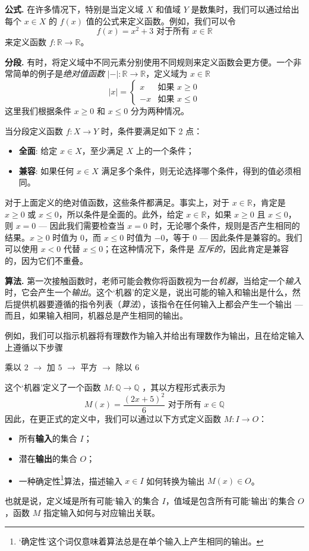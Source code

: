 \textbf{公式. } 在许多情况下，特别是当定义域 $X$ 和值域 $Y$ 是数集时，我们可以通过给出每个 $x \in X$ 的 $f(x)$ 值的公式来定义函数。例如，我们可以令 
\[ f(x) = x^2 + 3 \text{ 对于所有 } x \in \mathbb{R} \] 
来定义函数 $f : \mathbb{R} \to \mathbb{R}$。

\textbf{分段. } 有时，将定义域中不同元素分别使用不同规则来定义函数会更方便。一个非常简单的例子是\textit{绝对值函数} $|{-}| : \mathbb{R} \to \mathbb{R}$，定义域为 $x \in \mathbb{R}$
\[ |x| = \begin{cases} x & \text{如果 } x \ge 0 \\ -x & \text{如果 } x \le 0 \end{cases} \]
这里我们根据条件 $x \ge 0$ 和 $x \le 0$ 分为两种情况。

当分段定义函数 $f : X \to Y$ 时，条件要满足如下 2 点：
\begin{itemize}
\item \textbf{全面}: 给定 $x \in X$，至少满足 $X$ 上的一个条件；
\item \textbf{兼容}: 如果任何 $x \in X$ 满足多个条件，则无论选择哪个条件，得到的值必须相同。
\end{itemize}

对于上面定义的绝对值函数，这些条件都满足。事实上，对于 $x \in \mathbb{R}$，肯定是 $x \ge 0$ 或 $x \le 0$，所以条件是全面的。此外，给定 $x \in \mathbb{R}$，如果 $x \ge 0$ 且 $x \le 0$，则 $x=0$ --- 因此我们需要检查当 $x=0$ 时，无论哪个条件，规则是否产生相同的结果。$x \ge 0$ 时值为 $0$，而 $x \le 0$ 时值为 $-0$，等于 $0$ --- 因此条件是兼容的。我们可以使用 $x<0$ 代替 $x \le 0$；在这种情况下，条件是 \textit{互斥的}，因此肯定是兼容的，因为它们不重叠。

\textbf{算法. } 第一次接触函数时，老师可能会教你将函数视为一台\textit{机器}，当给定一个\textit{输入}时，它会产生一个\textit{输出}。这个`机器'的定义是，说出可能的输入和输出是什么，然后提供机器要遵循的指令列表（\textit{算法}），该指令在任何输入上都会产生一个输出 --- 而且，如果输入相同，机器总是产生相同的输出。

例如，我们可以指示机器将有理数作为输入并给出有理数作为输出，且在给定输入上遵循以下步骤
\begin{center}
\label{txtAlgorithmicallyDefinedFunctionExample}
乘以 $2$ $\to$ 加 $5$ $\to$ 平方 $\to$ 除以 $6$
\end{center}
这个`机器'定义了一个函数 $M : \mathbb{Q} \to \mathbb{Q}$ ，其以方程形式表示为
\[ M(x) = \frac{(2x+5)^2}{6} \text{ 对于所有 } x \in \mathbb{Q} \]
因此，在更正式的定义中，我们可以通过以下方式定义函数 $M : I \to O$：
\begin{itemize}
\item 所有\textbf{输入}的集合 $I$；
\item 潜在\textbf{输出}的集合 $O$；
\item 一种确定性\footnote{`确定性'这个词仅意味着算法总是在单个输入上产生相同的输出。}算法，描述输入 $x \in I$ 如何转换为输出 $M(x) \in O$。
\end{itemize}
也就是说，定义域是所有可能`输入'的集合 $I$，值域是包含所有可能`输出'的集合 $O$，函数 $M$ 指定输入如何与对应输出关联。

